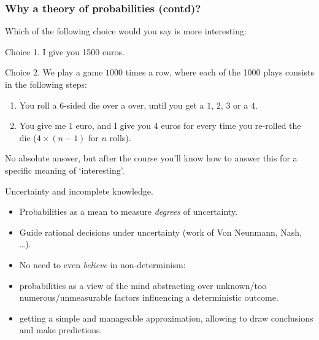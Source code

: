 \documentclass{beamer}
\begin{document}
\begin{frame}
  \frametitle{Why a theory of probabilities (contd)?}
  Which of the following choice would you say is more interesting:
  
  \begin{exampleblock}{Choice 1.}
    I give you 1500 euros.
  \end{exampleblock}

  \begin{exampleblock}{Choice 2.}
    We play a game $1000$ times a row, where each of the 1000 plays consists in the following steps:
    \begin{enumerate}
    \item You roll a $6$-sided die over a over, until you get a $1$, $2$, $3$ or a $4$.
    \item You give me $1$ euro, and I give you $4$ euros for every time you re-rolled the die ($4 \times (n-1)$ for $n$ rolls).
    \end{enumerate}
  \end{exampleblock}

  \alert{No absolute answer, but after the course you'll know how to answer this for a specific meaning of `interesting'.}

\end{frame}

\begin{frame}{Uncertainty and incomplete knowledge.}

  \begin{itemize}
  \item Probabilities as a mean to measure \emph{degrees} of uncertainty.
  \item Guide rational decisions under uncertainty (work of Von Neunmann, Nash, \dots).
  \item No need to even \emph{believe} in non-determinism:
  \item probabilities as a view of the mind abstracting over unknown/too numerous/unmeasurable factors influencing a deterministic outcome.
  \item getting a simple and manageable approximation, allowing to draw conclusions and make predictions.
  \end{itemize}
  
\end{frame}
\end{document}
